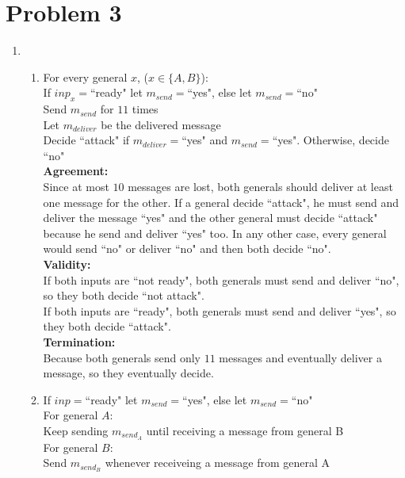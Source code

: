 \documentclass[12pt]{article}
\begin{document}
\section*{Problem 3}
\begin{enumerate}
\item
	\begin{enumerate}
	\item
	For every general $x$, ($x\in\{A,B\}$):\\
	If $inp_x=$``ready" let $m_{send}=$``yes", else let $m_{send}=$``no"\\
	Send $m_{send}$ for $11$ times\\
	
	Let $m_{deliver}$ be the delivered message\\
	Decide ``attack" if $m_{deliver}=$``yes" and $m_{send}=$``yes". Otherwise, decide ``no"\\
	
	\textbf{Agreement:}\\
	Since at most $10$ messages are lost, both generals should deliver at least one message for the other. If a general decide ``attack", he must send and deliver the message ``yes" and the other general must decide ``attack" because he send and deliver ``yes" too. In any other case, every general would send ``no" or deliver ``no" and then both decide ``no".\\
	
	\textbf{Validity:}\\
	If both inputs are ``not ready", both generals must send and deliver ``no", so they both decide ``not attack".\\
	If both inputs are ``ready", both generals must send and deliver ``yes", so they both decide ``attack".\\
	
	\textbf{Termination:}\\
	Because both generals send only $11$ messages and eventually deliver a message, so they eventually decide.
	\item
	If $inp=$``ready" let $m_{send}=$``yes", else let $m_{send}=$``no"\\
	
	For general $A$:\\
	Keep sending $m_{send_A}$ until receiving a message from general B\\
	
	For general $B$:\\
	Send $m_{send_B}$ whenever receiveing a message from general A\\
	

\end{enumerate}
\end{enumerate}
\end{document}
